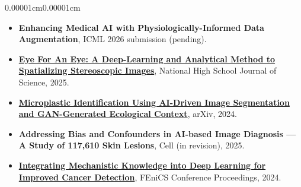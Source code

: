 \documentclass[10pt, letterpaper]{article}
\newenvironment{highlights}{
  \begin{itemize}[topsep=0.04cm, parsep=0.02cm, partopsep=0pt, itemsep=0pt, leftmargin=10pt]
}{
  \end{itemize}
}
\newenvironment{onecolentry}{
  \begin{adjustwidth}{0.00001cm}{0.00001cm}
}{
  \end{adjustwidth}
}
\begin{document}
  \begin{onecolentry}
    \begin{highlights}
      \item \small \textbf{Enhancing Medical AI with Physiologically-Informed Data Augmentation}, ICML 2026 submission (pending).
      \item \small \textbf{\href{https://nhsjs.com/2025/eye-for-an-eye-a-deep-learning-and-analytical-method-to-spatializing-stereoscopic-images/\#google_vignette}{Eye For An Eye: A Deep-Learning and Analytical Method to Spatializing Stereoscopic Images}}, National High School Journal of Science, 2025.
      \item \small \textbf{\href{https://arxiv.org/abs/2410.19604}{Microplastic Identification Using AI-Driven Image Segmentation and GAN-Generated Ecological Context}}, arXiv, 2024.
      \item \small \textbf{Addressing Bias and Confounders in AI-based Image Diagnosis --- A Study of 117,610 Skin Lesions}, Cell (in revision), 2025.
      \item \small \textbf{\href{https://scientificcomputing.github.io/fenics2024/integrating-mechanistic}{Integrating Mechanistic Knowledge into Deep Learning for Improved Cancer Detection}}, FEniCS Conference Proceedings, 2024.
    \end{highlights}
  \end{onecolentry}
\end{document}
